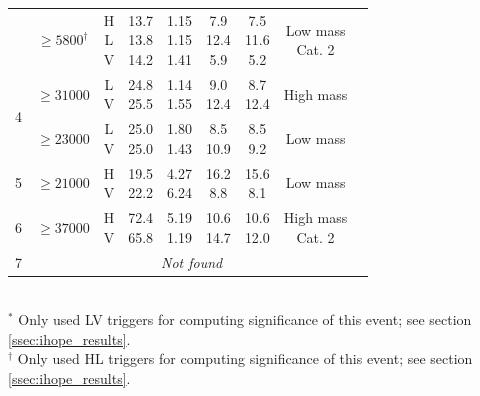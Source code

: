 \begin{table}
\begin{tabular}{@{}ccccccccc}
      & $\geq 5800^{\dagger}$ &  \subrows{H\\L\\V} & \subrows{13.7\\13.8\\14.2} 
& \subrows{1.15\\1.15\\1.41} & \subrows{7.9\\12.4\\5.9} & 
\subrows{7.5\\11.6\\5.2} & \subrows{Low mass\\Cat. 2} 
\\ 
    \multirow{2}{*}{4} & $\geq 31000$ & \subrows{L\\V} & \subrows{24.8\\25.5} & 
\subrows{1.14\\1.55} &
\subrows{9.0\\12.4} & \subrows{8.7\\12.4} & High mass \\ \cline{2-8}
      & $\geq 23000$ & \subrows{L\\V} & \subrows{25.0\\25.0} & 
\subrows{1.80\\1.43} & \subrows{8.5\\10.9} & 
\subrows{8.5\\9.2} & Low mass \\ 
    5 & $\geq 21000$ & \subrows{H\\V} & \subrows{19.5\\22.2} & 
\subrows{4.27\\6.24} & \subrows{16.2\\8.8} & 
\subrows{15.6\\8.1} & Low mass \\ 
    6 & $\geq 37000$ & \subrows{H\\V} & \subrows{72.4\\65.8} & 
\subrows{5.19\\1.19} & \subrows{10.6\\14.7} & 
\subrows{10.6\\12.0} & \subrows{High mass\\Cat. 2} \\
    7 & \multicolumn{7}{c}{\it{Not found}}  \\ 
\end{tabular}
\\
$^*$ Only used LV triggers for computing significance of this
event; see section \ref{ssec:ihope_results}. \\
$^\dagger$ Only used HL triggers for computing significance of
this event; see section \ref{ssec:ihope_results}.

\end{table}

